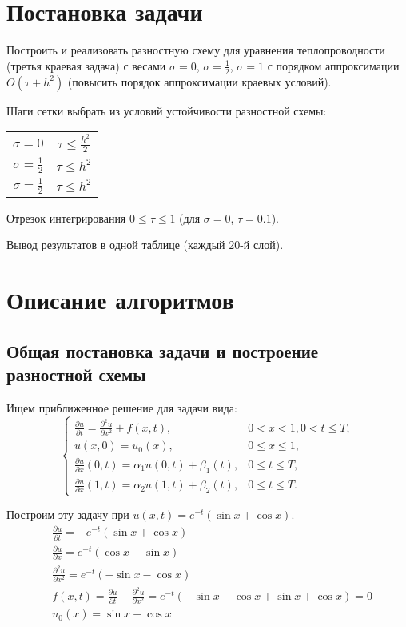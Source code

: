 ﻿





\chapter{Постановка задачи}
Построить и реализовать разностную схему для уравнения теплопроводности (третья краевая задача) с весами $\sigma=0$, $\sigma=\frac{1}{2}$, $\sigma=1$ с порядком аппроксимации $O(\tau+h^2)$ (повысить порядок аппроксимации краевых условий).\par
Шаги сетки выбрать из условий устойчивости разностной схемы:
\begin{tabular}{cc}
$\sigma=0$ & $\tau \le \frac{h^{2}}{2}$ \\
$\sigma=\frac{1}{2}$ & $\tau \le h^{2}$ \\
$\sigma=\frac{1}{2}$ & $\tau \le h^{2}$
\end{tabular} \par
Отрезок интегрирования $0 \le \tau \le 1$ (для $\sigma=0$, $\tau = 0.1$). \par
Вывод результатов в одной таблице (каждый 20-й слой).

\chapter{Описание алгоритмов}
\section{Общая постановка задачи и построение разностной схемы}
Ищем приближенное решение для задачи вида:
\begin{equation}
\left\{
\begin{array}{ll}
\frac{\partial u}{\partial t}=\frac{\partial^{2} u}{\partial x^{2}}+f(x,t), & 0<x<1, 0<t\le T, \\
u(x,0)=u_{0}(x), & 0\le x \le 1, \\
\frac{\partial u}{\partial x}(0,t)=\alpha_{1}u(0,t)+\beta_{1}(t), & 0 \le t \le T, \\
\frac{\partial u}{\partial x}(1,t)=\alpha_{2}u(1,t)+\beta_{2}(t), & 0 \le t \le T.
\end{array}
\right.
\end{equation}

Построим эту задачу при $u(x,t)=e^{-t}(\sin x + \cos x)$.
\begin{eqnarray*}
& \frac{\partial u}{\partial t}=-e^{-t}(\sin x + \cos x) \\
& \frac{\partial u}{\partial x}=e^{-t}(\cos x - \sin x) \\
& \frac{\partial^{2} u}{\partial x^{2}}=e^{-t}(-\sin x - \cos x) \\
& f(x,t)=\frac{\partial u}{\partial t}-\frac{\partial^{2} u}{\partial x^{2}}=e^{-t}(-\sin x - \cos x + \sin x + \cos x)=0 \\
& u_{0}(x)=\sin x + \cos x
\end{eqnarray*}



